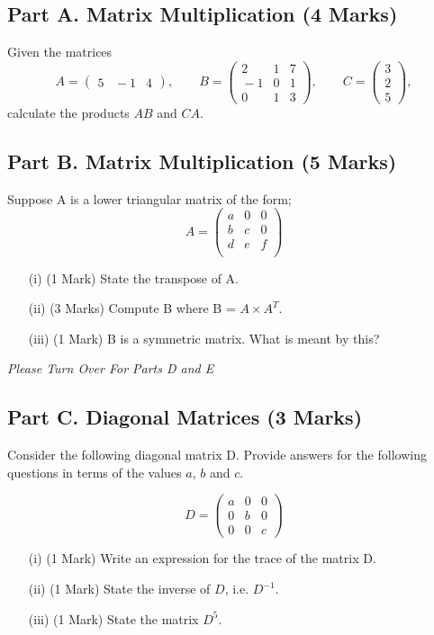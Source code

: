 \documentclass[a4paper,12pt]{article}
\begin{document}
	\subsection*{Part A. Matrix Multiplication (4 Marks)}	
	Given the matrices 
	$$
	A=\left(\begin{array}{cccc} 
	5&\!\!\!-1&4\end{array}
	\right), \qquad
	B =\left(\begin{array}{ccc} 
	2&1&7\\ \!\!\!-1&0&1\\0&1&3\end{array}
	\right), \qquad
	C=\left(\begin{array}{c} 3\\2\\ 5\end{array}
	\right),
	$$
	calculate the products $AB$ and $CA$.

	\subsection*{Part B. Matrix Multiplication (5 Marks)}	
		Suppose A is a lower triangular matrix of the form;
		\[A = \left(
		\begin{matrix}
		a & 0 & 0 \\
		b & c & 0 \\
		d & e & f \\
		\end{matrix} \right)
		\]
		
		\begin{itemize}
			\item[(i)] (1 Mark) State the transpose of A.
			\item[(ii)] (3 Marks) Compute B where B = $ A \times A^{T}$. 
			\item[(iii)] (1 Mark) B is a symmetric matrix. What is meant by this?
		\end{itemize}
		\noindent 	\textit{Please Turn Over For Parts D and E}
			\subsection*{Part C. Diagonal Matrices (3 Marks)}	
			Consider the following diagonal matrix D. Provide answers for the following questions in terms of the values $a$, $b$ and $c$.
			
			
			\[D = \left(\begin{array}{ccc}
			a & 0 & 0 \\ 
			0 & b & 0 \\ 
			0 & 0 & c
			\end{array} \right)\]
			\begin{itemize}
				\item[(i)] (1 Mark) Write an expression for the trace of the matrix D.
				\item[(ii)] (1 Mark) State the inverse of $D$, i.e. $D^{-1}$.
				\item[(iii)] (1 Mark) State the matrix $D^5$.
			\end{itemize}
			\smallskip
	\newpage
\end{document}
